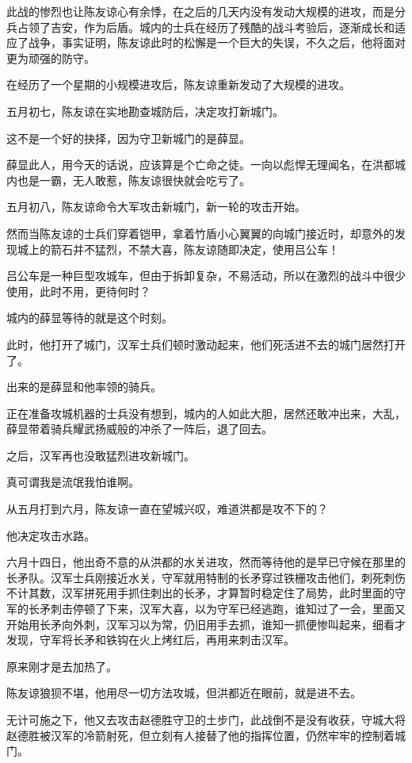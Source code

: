 \begin{multicols}{\theparacolNo}
		此战的惨烈也让陈友谅心有余悸，在之后的几天内没有发动大规模的进攻，而是分兵占领了吉安，作为后盾。城内的士兵在经历了残酷的战斗考验后，逐渐成长和适应了战争，事实证明，陈友谅此时的松懈是一个巨大的失误，不久之后，他将面对更为顽强的防守。

		在经历了一个星期的小规模进攻后，陈友谅重新发动了大规模的进攻。

		五月初七，陈友谅在实地勘查城防后，决定攻打新城门。

		这不是一个好的抉择，因为守卫新城门的是薛显。

		薛显此人，用今天的话说，应该算是个亡命之徒。一向以彪悍无理闻名，在洪都城内也是一霸，无人敢惹，陈友谅很快就会吃亏了。

		五月初八，陈友谅命令大军攻击新城门，新一轮的攻击开始。

		然而当陈友谅的士兵们穿着铠甲，拿着竹盾小心翼翼的向城门接近时，却意外的发现城上的箭石并不猛烈，不禁大喜，陈友谅随即决定，使用吕公车！

		吕公车是一种巨型攻城车，但由于拆卸复杂，不易活动，所以在激烈的战斗中很少使用，此时不用，更待何时？

		城内的薛显等待的就是这个时刻。

		此时，他打开了城门，汉军士兵们顿时激动起来，他们死活进不去的城门居然打开了。

		出来的是薛显和他率领的骑兵。

		正在准备攻城机器的士兵没有想到，城内的人如此大胆，居然还敢冲出来，大乱，薛显带着骑兵耀武扬威般的冲杀了一阵后，退了回去。

		之后，汉军再也没敢猛烈进攻新城门。

		真可谓我是流氓我怕谁啊。

		从五月打到六月，陈友谅一直在望城兴叹，难道洪都是攻不下的？

		他决定攻击水路。

		六月十四日，他出奇不意的从洪都的水关进攻，然而等待他的是早已守候在那里的长矛队。汉军士兵刚接近水关，守军就用特制的长矛穿过铁栅攻击他们，刺死刺伤不计其数，汉军拼死用手抓住刺出的长矛，才算暂时稳定住了局势，此时里面的守军的长矛刺击停顿了下来，汉军大喜，以为守军已经逃跑，谁知过了一会，里面又开始用长矛向外刺，汉军习以为常，仍旧用手去抓，谁知一抓便惨叫起来，细看才发现，守军将长矛和铁钩在火上烤红后，再用来刺击汉军。

		原来刚才是去加热了。

		陈友谅狼狈不堪，他用尽一切方法攻城，但洪都近在眼前，就是进不去。

		无计可施之下，他又去攻击赵德胜守卫的土步门，此战倒不是没有收获，守城大将赵德胜被汉军的冷箭射死，但立刻有人接替了他的指挥位置，仍然牢牢的控制着城门。


\end{multicols}
